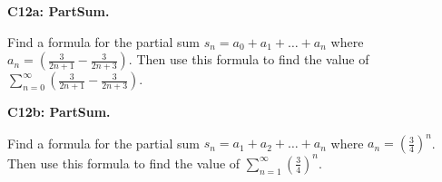 \documentclass[12pt]{article}
\newcommand{\<}{\left\langle}
\renewcommand{\>}{\right\rangle}
\newcommand{\exerciseHeader}[4]{


  \vspace{0.5em}
  \textbf{#2}
  \vspace{0.5em}

}
\begin{document}
\begin{multicols}{2}
\columnbreak

%

\exerciseHeader{2017 July 14}{C12a: PartSum.}{
Find the value of a convergent series by expressing it as a limit of
partial sums.
}{4/4}

Find a formula for the partial sum \(s_n=a_0+a_1+\dots+a_n\) where
\(a_n=(\frac{3}{2n+1}-\frac{3}{2n+3})\). Then use this formula to find
the value of \(\sum_{n=0}^\infty
(\frac{3}{2n+1}-\frac{3}{2n+3})\).

\exerciseHeader{2017 July 14}{C12b: PartSum.}{
Find the value of a convergent series by expressing it as a limit of
partial sums.
}{4/4}

Find a formula for the partial sum \(s_n=a_1+a_2+\dots+a_n\) where
\(a_n=(\frac{3}{4})^n\). Then use this formula to find
the value of \(\sum_{n=1}^\infty (\frac{3}{4})^n\).



%
%

%
%

%
%


\end{multicols}
\end{document}
